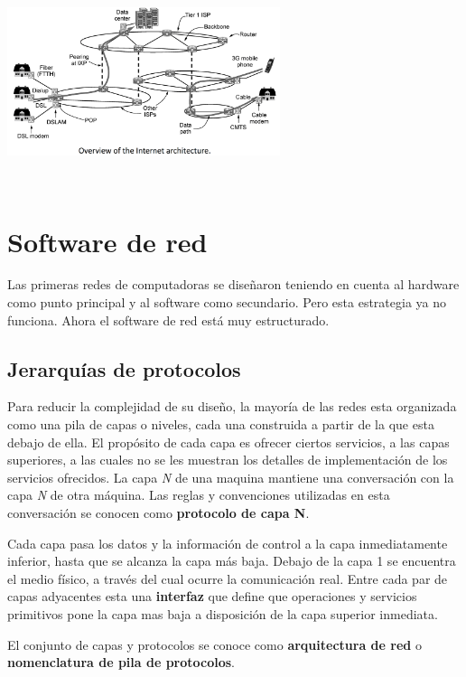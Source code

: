 \documentclass[10pt,a4paper]{report}
\begin{document}
\begin{center} 
	\includegraphics[width=8cm, height=6cm]{./imagenes/interred.png} 
\end{center}

\section{Software de red}
\par Las primeras redes de computadoras se diseñaron teniendo en cuenta al hardware 
como punto principal y al software como secundario. Pero esta estrategia ya no 
funciona. Ahora el software de red está muy estructurado.

\subsection{Jerarquías de protocolos}
\par Para reducir la complejidad de su diseño, la mayoría de las redes esta organizada 
como una pila de capas o niveles, cada una construida a partir de la que esta debajo de 
ella. El propósito de cada capa es ofrecer ciertos servicios, a las capas superiores, a las 
cuales no se les muestran los detalles de implementación de los servicios ofrecidos. La 
capa \textit{N} de una maquina mantiene una conversación con la capa \textit{N} de 
otra máquina. Las reglas y convenciones utilizadas en esta conversación se conocen 
como \textbf{protocolo de capa N}.
\par Cada capa pasa los datos y la información de control a la capa inmediatamente 
inferior, hasta que se alcanza la capa más baja. Debajo de la capa 1 se encuentra el 
medio físico, a través del cual ocurre la comunicación real. Entre cada par de capas 
adyacentes esta una \textbf{interfaz} que define que operaciones y servicios 
primitivos pone la capa mas baja a disposición de la capa superior inmediata.
\par El conjunto de capas y protocolos se conoce como \textbf{arquitectura de red} o 
\textbf{nomenclatura de pila de protocolos}.
\end{document}
